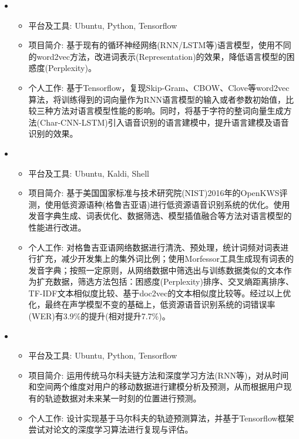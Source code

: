   \begin{itemize}[leftmargin=*]
    \item {}
      {\small
      \begin{itemize}
        \item 平台及工具: Ubuntu, Python, Tensorflow
        \item 项目简介: 基于现有的循环神经网络(RNN/LSTM等)语言模型，使用不同的word2vec方法，改进词表示(Representation)的效果，降低语言模型的困惑度(Perplexity)。
        \item 个人工作: 基于Tensorflow，复现Skip-Gram、CBOW、Clove等word2vec算法，将训练得到的词向量作为RNN语言模型的输入或者参数初始值，比较三种方法对语言模型性能的影响。同时，将基于字符的整词向量生成方法(Char-CNN-LSTM)引入语音识别的语言建模中，提升语言建模及语音识别的效果。
      \end{itemize}
      }

    \item {}
      {\small
      \begin{itemize}
        \item 平台及工具: Ubuntu, Kaldi, Shell
        \item 项目简介: 基于美国国家标准与技术研究院(NIST)2016年的OpenKWS评测，使用低资源语种(格鲁吉亚语)进行低资源语音识别系统的优化。使用发音字典生成、词表优化、数据筛选、模型插值融合等方法对语言模型的性能进行改进。
        \item 个人工作: 对格鲁吉亚语网络数据进行清洗、预处理，统计词频对词表进行扩充，减少开发集上的集外词比例；使用Morfessor工具生成现有词表的发音字典；按照一定原则，从网络数据中筛选出与训练数据类似的文本作为扩充数据，筛选方法包括：困惑度(Perplexity)排序、交叉熵距离排序、TF-IDF文本相似度比较、基于doc2vec的文本相似度比较等。经过以上优化，最终在声学模型不变的基础上，低资源语音识别系统的词错误率(WER)有3.9\%的提升(相对提升7.7\%)。
      \end{itemize}
      }

    \item {}
      {\small
      \begin{itemize}
        \item 平台及工具: Ubuntu, Python, Tensorflow
        \item 项目简介: 运用传统马尔科夫链方法和深度学习方法(RNN等)，对从时间和空间两个维度对用户的移动数据进行建模分析及预测，从而根据用户现有的轨迹数据对未来某一时刻的位置进行预测。
        \item 个人工作: 设计实现基于马尔科夫的轨迹预测算法，并基于Tensorflow框架尝试对论文的深度学习算法进行复现与评估。 
      \end{itemize}
      }
      

\end{itemize}
